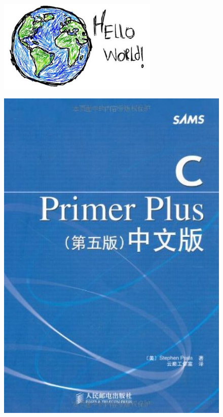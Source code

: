 \begin{frame}[fragile]
\begin{figure}
\centering
\includegraphics[width=3in]{ch01/fig/helloworld}
\end{figure}



\end{frame}

\begin{frame}
\begin{figure}
\centering
\includegraphics[width=2.in]{ch01/fig/cprimerplus}
\end{figure}
\end{frame}